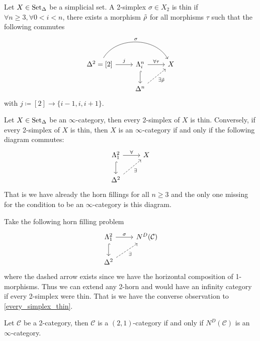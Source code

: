 \begin{defi}
\label{thin_defi}
	Let $ X \in \operatorname{Set}_{\Delta} $ be a simplicial set. 
	A 2-simplex $ \sigma \in X_2 $ is thin if $ \forall n \geq 3, \forall 0 < i < n $, there exists 
	a morphism $ \Tilde{ \rho } $ for all morphisms $ \tau $ such that the following commutes
	\[
	\begin{tikzcd}
		\Delta^2 = [ 2 ] 
		\ar[r, " j "]
		\ar[rr, bend left = 60, " \sigma "]
		&
		\Lambda_i^n
		\ar[r, " \forall \tau"]
		\ar[d, hook]
		&
		X
		\\
		&
		\Delta^n 
		\ar[ru, dashed, "\exists \Tilde{\rho}"']
	\end{tikzcd}
	\] 	
	with $ j \coloneqq [ 2 ] \to \{ i -1 , i , i + 1 \} $.
\end{defi}

\begin{rmk}
\label{every_simplex_thin}
	Let $ X \in \operatorname{Set}_{\Delta} $ be an $ \infty $-category, then every 2-simplex of $ X $ is thin.
	Conversely, if every 2-simplex of $ X $ is thin, then $ X $ is an $ \infty $-category if and only if the following diagram commutes:
	\[
	\begin{tikzcd}
		\Lambda_1^2 
		\ar[r, " \forall"]
		\ar[d, hook]
		&
		X
		\\
		\Delta^2
		\ar[ru, dashed, "\exists"']
	\end{tikzcd}
	\]
	That is we have already the horn fillings for all $ n \geq 3 $ and the only one missing for the condition to be an $ \infty $-category is this diagram.
\end{rmk}

\begin{rmk}
\label{remark_thin_Duskin}
	Take the following horn filling problem
	\[
	\begin{tikzcd}
		\Lambda_1^2
		\ar[r, " \sigma "]
		\ar[d, hook]
		&
		N^D ( \mathcal{ C } )
		\\
		\Delta^2
		\ar[ru, dashed, "\exists"']
	\end{tikzcd}
	\]
	where the dashed arrow exists since we have the horizontal composition of 1-morphisms.
	Thus we can extend any 2-horn and would have an infinity category if every 2-simplex were thin.
	That is we have the converse observation to \ref{every_simplex_thin}.
\end{rmk}

\begin{thm}
	Let $ \mathcal{ C } $ be a 2-category, then $ \mathcal{ C } $ is a $ ( 2 , 1 ) $-category if and only if $ N^D ( \mathcal{ C } ) $ is an $ \infty $-category.
\end{thm}

